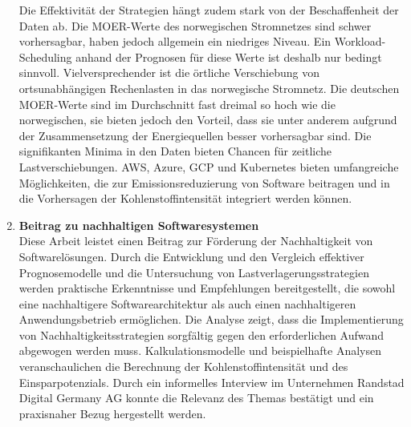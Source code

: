 \begin{enumerate}
 Die Effektivität der Strategien hängt zudem stark von der Beschaffenheit der Daten ab.
 Die \ac{MOER}-Werte des norwegischen Stromnetzes sind schwer vorhersagbar, haben jedoch allgemein ein niedriges Niveau.
 Ein Workload-Scheduling anhand der Prognosen für diese Werte ist deshalb nur bedingt sinnvoll.
 Vielversprechender ist die örtliche Verschiebung von ortsunabhängigen Rechenlasten in das norwegische Stromnetz.
 Die deutschen \ac{MOER}-Werte sind im Durchschnitt fast dreimal so hoch wie die norwegischen, sie bieten jedoch den Vorteil, dass sie unter anderem aufgrund der Zusammensetzung der Energiequellen besser vorhersagbar sind.
 Die signifikanten Minima in den Daten bieten Chancen für zeitliche Lastverschiebungen.
 \ac{AWS}, Azure, \ac{GCP} und Kubernetes bieten umfangreiche Möglichkeiten, die zur Emissionsreduzierung von Software beitragen und in die Vorhersagen der Kohlenstoffintensität integriert werden können.
 \item \textbf{Beitrag zu nachhaltigen Softwaresystemen} \\
 Diese Arbeit leistet einen Beitrag zur Förderung der Nachhaltigkeit von Softwarelösungen.
 Durch die Entwicklung und den Vergleich effektiver Prognosemodelle und die Untersuchung von Lastverlagerungsstrategien werden praktische Erkenntnisse und Empfehlungen bereitgestellt, die sowohl eine nachhaltigere Softwarearchitektur als auch einen nachhaltigeren Anwendungsbetrieb ermöglichen.
 Die Analyse zeigt, dass die Implementierung von Nachhaltigkeitsstrategien sorgfältig gegen den erforderlichen Aufwand abgewogen werden muss.
 Kalkulationsmodelle und beispielhafte Analysen veranschaulichen die Berechnung der Kohlenstoffintensität und des Einsparpotenzials.
 Durch ein informelles Interview im Unternehmen Randstad Digital Germany AG konnte die Relevanz des Themas bestätigt und ein praxisnaher Bezug hergestellt werden.
\end{enumerate}
